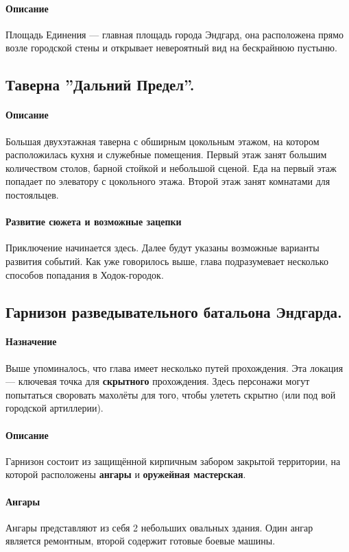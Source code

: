 \documentclass[a4paper,12pt,twoside,twocolumn]{book}
\begin{document}
\paragraph{Описание}
Площадь Единения --- главная площадь города Эндгард, она расположена прямо возле городской стены и открывает невероятный вид на бескрайнюю пустыню.
\subsection{Таверна ''Дальний Предел''.}
\paragraph{Описание}
Большая двухэтажная таверна с обширным цокольным этажом, на котором расположилась кухня и служебные помещения. Первый этаж занят большим количеством столов, барной стойкой 
и небольшой сценой. Еда на первый этаж попадает по элеватору с цокольного этажа. Второй этаж занят комнатами для постояльцев.
\paragraph{Развитие сюжета и возможные зацепки}
Приключение начинается здесь. Далее будут указаны возможные варианты развития событий. Как уже говорилось выше, глава подразумевает несколько способов попадания в 
Ходок-городок.
\subsection{Гарнизон разведывательного батальона Эндгарда.}
\paragraph{Назначение}
Выше упоминалось, что глава имеет несколько путей прохождения. Эта локация — ключевая точка для \textbf{скрытного} прохождения. Здесь персонажи могут попытаться своровать 
махолёты для того, чтобы улететь скрытно (или под вой городской артиллерии).
\paragraph{Описание}
Гарнизон состоит из защищённой кирпичным забором закрытой территории, на которой расположены \textbf{ангары} и \textbf{оружейная мастерская}.
\paragraph{Ангары}
Ангары представляют из себя 2 небольших овальных здания. Один ангар является ремонтным, второй содержит готовые боевые машины.
\end{document}
